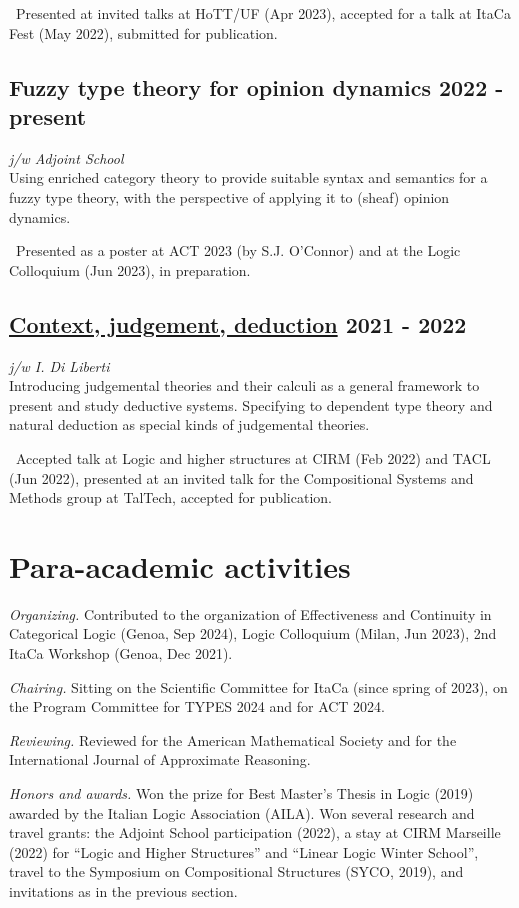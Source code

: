 \documentclass[a4paper,9pt]{article}
\begin{document}
\, Presented at invited talks at HoTT/UF (Apr 2023), accepted for a talk at ItaCa Fest (May 2022), submitted for publication.

\subsection*{Fuzzy type theory for opinion dynamics \hfill 2022 - present}
\textit{j/w Adjoint School}\\
Using enriched category theory to provide suitable syntax and semantics for a fuzzy type theory, with the perspective of applying it to (sheaf) opinion dynamics.

\, Presented as a poster at ACT 2023 (by S.J. O'Connor) and at the Logic Colloquium (Jun 2023), in preparation.

\subsection*{\href{https://arxiv.org/abs/2111.09438}{Context, judgement, deduction} \hfill 2021 - 2022}
\textit{j/w I. Di Liberti}\\
Introducing judgemental theories and their calculi as a general framework to present and study deductive systems. Specifying to dependent type theory and natural deduction as special kinds of judgemental theories.

\, Accepted talk at Logic and higher structures at CIRM (Feb 2022) and TACL (Jun 2022), presented at an invited talk for the Compositional Systems and Methods group at TalTech, accepted for publication.

\section*{ Para-academic activities}
\textit{Organizing.} Contributed to the organization of Effectiveness and Continuity in Categorical Logic (Genoa, Sep 2024), Logic Colloquium (Milan, Jun 2023), 2nd ItaCa Workshop (Genoa, Dec 2021).

\textit{Chairing.} Sitting on the Scientific Committee for ItaCa (since spring of 2023), on the Program Committee for TYPES 2024 and for ACT 2024.

\textit{Reviewing.} Reviewed for the American Mathematical Society and for the International Journal of Approximate Reasoning.

\textit{Honors and awards.} Won the prize for Best Master's Thesis in Logic (2019) awarded by the Italian Logic Association (AILA). Won several research and travel grants: the Adjoint School participation (2022), a stay at CIRM Marseille (2022) for ``Logic and Higher Structures'' and ``Linear Logic Winter School'', travel to the Symposium on Compositional Structures (SYCO, 2019), and invitations as in the previous section.
\end{document}
